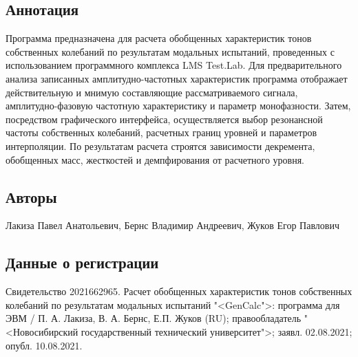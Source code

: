%
%

\subsection*{Аннотация}

Программа предназначена для расчета обобщенных характеристик тонов собственных колебаний по результатам модальных испытаний, проведенных с использованием программного комплекса LMS Test.Lab. Для предварительного анализа записанных амплитудно-частотных характеристик программа отображает действительную и мнимую составляющие рассматриваемого сигнала, амплитудно-фазовую частотную характеристику и параметр монофазности. Затем, посредством графического интерфейса, осуществляется выбор резонансной частоты собственных колебаний, расчетных границ уровней и параметров интерполяции. По результатам расчета строятся зависимости декремента, обобщенных масс, жесткостей и демпфирования от расчетного уровня.

\subsection*{Авторы}

Лакиза Павел Анатольевич, Бернс Владимир Андреевич, Жуков Егор Павлович

\subsection*{Данные о регистрации}

Свидетельство 2021662965. Расчет обобщенных характеристик тонов собственных колебаний по результатам модальных испытаний "<GenCalc">: программа для ЭВМ / П. А. Лакиза, В. А. Бернс, Е.П. Жуков (RU); правообладатель "<Новосибирский государственный технический университет">; заявл. 02.08.2021; опубл. 10.08.2021.

%